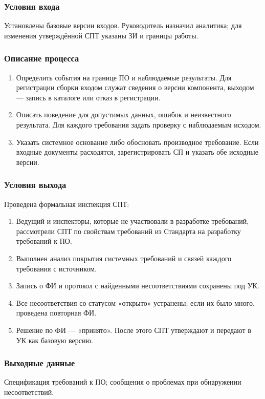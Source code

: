 \documentclass{tpks}
\begin{document}
\subsubsection{Условия входа}
Установлены базовые версии входов. Руководитель назначил аналитика; для изменения утверждённой СПТ указаны ЗИ и границы работы.

\subsubsection{Описание процесса}
\begin{enumerate}
\item Определить события на границе ПО и наблюдаемые результаты. Для регистрации сборки входом служат сведения о версии компонента, выходом --- запись в каталоге или отказ в регистрации.
\item Описать поведение для допустимых данных, ошибок и неизвестного результата. Для каждого требования задать проверку с наблюдаемым исходом.
\item Указать системное основание либо обосновать производное требование. Если входные документы расходятся, зарегистрировать СП и указать обе исходные версии.
\end{enumerate}

\subsubsection{Условия выхода}
Проведена формальная инспекция СПТ:
\begin{enumerate}
\item Ведущий и инспекторы, которые не участвовали в разработке требований, рассмотрели СПТ по свойствам требований из Стандарта на разработку требований к ПО.
\item Выполнен анализ покрытия системных требований и связей каждого требования с источником.
\item Запись о ФИ и протокол с найденными несоответствиями сохранены под УК.
\item Все несоответствия со статусом «открыто» устранены; если их было много, проведена повторная ФИ.
\item Решение по ФИ — «принято». После этого СПТ утверждают и передают в УК как базовую версию.
\end{enumerate}

\subsubsection{Выходные данные}
Спецификация требований к ПО; сообщения о проблемах при обнаружении несоответствий.
\end{document}
